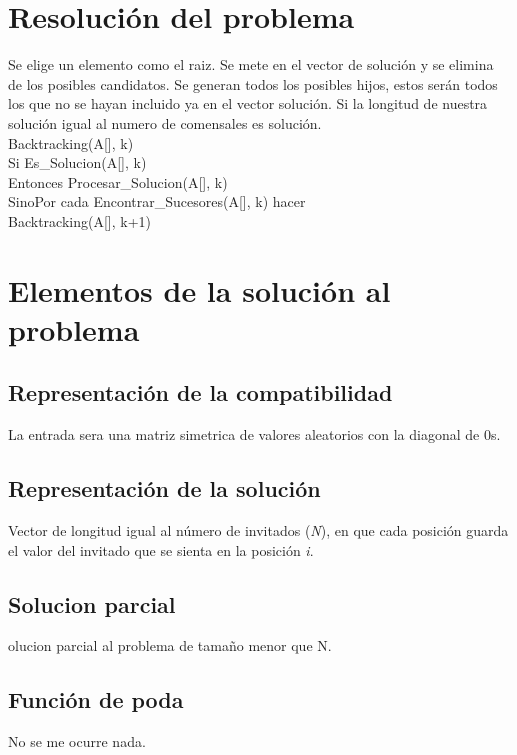 \section{Resolución del problema}

Se elige un elemento como el raiz.
Se mete en el vector de solución y se elimina de los posibles candidatos.
Se generan todos los posibles hijos, estos serán todos los que no se hayan incluido ya en el vector solución.
Si la longitud de nuestra solución igual al numero de comensales es solución.\\


Backtracking(A[], k)\\
		Si Es\_Solucion(A[], k)\\
			Entonces Procesar\_Solucion(A[], k)\\
		SinoPor cada Encontrar\_Sucesores(A[], k) hacer\\
			Backtracking(A[], k+1)\\
	


\section{Elementos de la solución al problema}

\subsection{Representación de la compatibilidad}
La entrada sera una matriz simetrica de valores aleatorios con la diagonal de 0s.

\subsection{Representación de la solución}
Vector de longitud igual al número de invitados (\textit{N}), en que cada posición guarda el valor del invitado que se sienta en la posición \textit{i}.

\subsection{Solucion parcial}
olucion parcial al problema de tamaño menor que N.

\subsection{Función de poda}
No se me ocurre nada.

